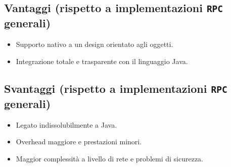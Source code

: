 \subsection{Vantaggi (rispetto a implementazioni \texttt{RPC} generali)}
\begin{itemize}
    \item Supporto nativo a un design orientato agli oggetti.
    \item Integrazione totale e trasparente con il linguaggio Java.
\end{itemize}
\subsection{Svantaggi (rispetto a implementazioni \texttt{RPC} generali)}
\begin{itemize}
    \item Legato indissolubilmente a Java.
    \item Overhead maggiore e prestazioni minori.
    \item Maggior complessità a livello di rete e problemi di sicurezza.
\end{itemize}
